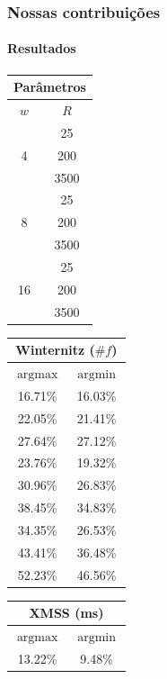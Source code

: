 \documentclass[12pt]{beamer}
\DeclareMathOperator*{\argmin}{argmin}
\DeclareMathOperator*{\argmax}{argmax}
\begin{document}
\begin{frame}
  \frametitle{Nossas contribuições}
  \framesubtitle{Resultados}
  \small
  \begin{table}
    \begin{tabular}{cc}
      \multicolumn{2}{c}{Parâmetros} \\
      \toprule
      $w$ &                 $R$     \\
      \midrule
      \multirow{3}{*}{4}    & 25    \\
                            & 200   \\
                            & 3500  \\
      \midrule
      \multirow{3}{*}{8}    & 25    \\
                            & 200   \\
                            & 3500  \\
      \midrule
      \multirow{3}{*}{16}   & 25    \\
                            & 200   \\
                            & 3500  \\
      \bottomrule
    \end{tabular}
    \begin{tabular}{cc}
      \multicolumn{2}{c}{Winternitz ($\# f$)} \\
      \toprule
      $\argmax{}$   & $\argmin{}$   \\
      \midrule
      16.71\%       & 16.03\%       \\
      22.05\%       & 21.41\%       \\
      27.64\%       & 27.12\%       \\
      \midrule
      23.76\%       & 19.32\%       \\
      30.96\%       & 26.83\%       \\
      38.45\%       & 34.83\%       \\
      \midrule
      34.35\%       & 26.53\%       \\
      43.41\%       & 36.48\%       \\
      52.23\%       & 46.56\%       \\
      \bottomrule
    \end{tabular}
    \begin{tabular}{cc}
      \multicolumn{2}{c}{XMSS (ms)} \\
      \toprule
      $\argmax{}$   & $\argmin{}$   \\
      \midrule
      13.22\%       &  9.48\%       \\

\end{tabular}
\end{table}
\end{frame}
\end{document}
